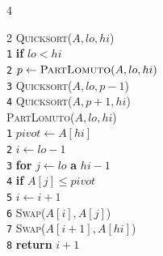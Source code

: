 \documentclass[10pt,landscape]{article}
\begin{document}
\begin{multicols*}{4}
                \begin{multicols}{2}
                        \textsc{Quicksort($A, lo, hi$)}\\ [3pt]
                        \verb|1|\hspace*{0.5em} \textbf{if} $lo < hi$\\
                        \verb|2|\hspace*{1.5em} $p \leftarrow \textsc{PartLomuto}(A, lo, hi)$\\
                        \verb|3|\hspace*{1.5em} \textsc{Quicksort}($A, lo, p - 1$)\\
                        \verb|4|\hspace*{1.5em} \textsc{Quicksort}($A, p + 1, hi$)\\
                        \columnbreak
                        \textsc{PartLomuto($A, lo, hi$)}\\
                        \verb|1|\hspace*{0.5em} $pivot \leftarrow A[hi]$\\
                        \verb|2|\hspace*{0.5em} $i \leftarrow lo - 1$\\
                        \verb|3|\hspace*{0.5em} \textbf{for} $j \leftarrow lo$ \textbf{a} $hi - 1$\\
                        \verb|4|\hspace*{1.5em} \textbf{if} $A[j] \le pivot$\\
                        \verb|5|\hspace*{2.5em} $i \leftarrow i + 1$\\
                        \verb|6|\hspace*{2.5em} \textsc{Swap}($A[i], A[j]$)\\
                        \verb|7|\hspace*{0.5em} \textsc{Swap}($A[i + 1], A[hi]$)\\
                        \verb|8|\hspace*{0.5em} \textbf{return} $i + 1$\\
                \end{multicols}


\end{multicols*}
\end{document}
